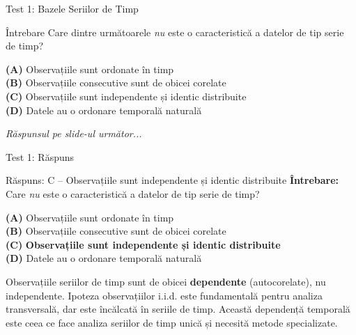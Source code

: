 \documentclass[9pt, aspectratio=169, t]{beamer}
\begin{document}
\begin{frame}{Test 1: Bazele Seriilor de Timp}
    \begin{alertblock}{Întrebare}
        Care dintre următoarele \emph{nu} este o caracteristică a datelor de tip serie de timp?
    \end{alertblock}

    \vspace{0.4cm}

    \textcolor{MainBlue}{\textbf{(A)}} Observațiile sunt ordonate în timp\\[3pt]
    \textcolor{MainBlue}{\textbf{(B)}} Observațiile consecutive sunt de obicei corelate\\[3pt]
    \textcolor{MainBlue}{\textbf{(C)}} Observațiile sunt independente și identic distribuite\\[3pt]
    \textcolor{MainBlue}{\textbf{(D)}} Datele au o ordonare temporală naturală

    \vspace{0.5cm}

    \begin{center}
        \textit{Răspunsul pe slide-ul următor...}
    \end{center}
\end{frame}

\begin{frame}{Test 1: Răspuns}
    \begin{exampleblock}{Răspuns: C -- Observațiile sunt independente și identic distribuite}
        \textbf{Întrebare:} Care \emph{nu} este o caracteristică a datelor de tip serie de timp?

        \vspace{0.3cm}

        \textcolor{MainBlue}{\textbf{(A)}} Observațiile sunt ordonate în timp \incorrect\\[3pt]
        \textcolor{MainBlue}{\textbf{(B)}} Observațiile consecutive sunt de obicei corelate \incorrect\\[3pt]
        \textcolor{MainBlue}{\textbf{(C)}} \textbf{\textcolor{Forest}{Observațiile sunt independente și identic distribuite}} \correct\\[3pt]
        \textcolor{MainBlue}{\textbf{(D)}} Datele au o ordonare temporală naturală \incorrect

        \vspace{0.3cm}

        Observațiile seriilor de timp sunt de obicei \textbf{dependente} (autocorelate), nu independente. Ipoteza observațiilor i.i.d. este fundamentală pentru analiza transversală, dar este încălcată în seriile de timp. Această dependență temporală este ceea ce face analiza seriilor de timp unică și necesită metode specializate.
    \end{exampleblock}
\end{frame}
\end{document}
